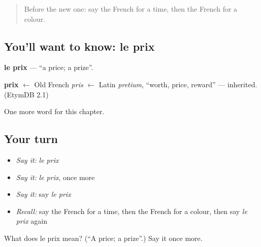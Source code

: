 \begin{quote}
Before the new one: say the French for a time, then the French for a colour.
\end{quote}

\subsection*{You'll want to know: le prix}
\textbf{le prix} — \textquotedblleft{}a price; a prize\textquotedblright{}.

\begin{cousinweb}
\textbf{prix} $\leftarrow$ Old French \emph{pris} $\leftarrow$ Latin \emph{pretium}, \textquotedblleft{}worth, price, reward\textquotedblright{} — inherited. (EtymDB 2.1)
\end{cousinweb}

\begin{grammarlens}[title={What you've built}]
One more word for this chapter.
\end{grammarlens}

\subsection*{Your turn}
\begin{itemize}
\raggedright
  \item \emph{Say it:} \emph{le prix}
  \item \emph{Say it:} \emph{le prix}, once more
  \item \emph{Say it:} say \emph{le prix}
  \item \emph{Recall:} say the French for a time, then the French for a colour, then say \emph{le prix} again
\end{itemize}

\begin{tcolorbox}[breakable,colback=teal!4,colframe=teal!35!black,title={Before you move on}]
What does le prix mean? (\textquotedblleft{}A price; a prize\textquotedblright{}.) Say it once more.
\end{tcolorbox}
